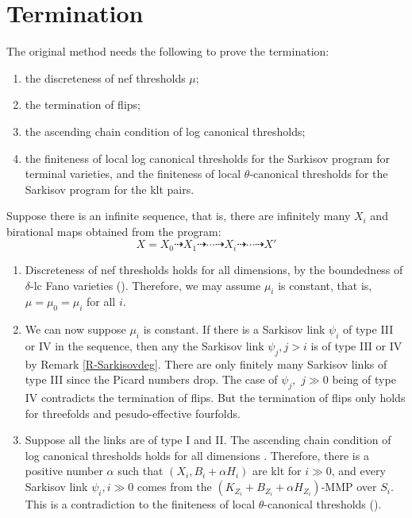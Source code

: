 \section{Termination}\label{termination1}
The original method  needs the following to prove the termination:
\begin{enumerate}
  \item the discreteness of nef thresholds $\mu$;
  \item the termination of flips;
  \item the ascending chain condition of log canonical thresholds;
  \item the finiteness of local log canonical thresholds for the Sarkisov program for terminal varieties, and the finiteness of local $\theta$-canonical thresholds for the Sarkisov program for the klt pairs.
\end{enumerate}
Suppose there is an infinite sequence, that is,  there are infinitely many $ X_i $ and birational maps obtained from the program:
\[ X=X_0\dashrightarrow X_1\dashrightarrow \cdots\dashrightarrow X_i \dashrightarrow\cdots\dashrightarrow X'\]
\begin{enumerate}
  \item Discreteness of nef thresholds holds for all dimensions, by the boundedness of $\delta$-lc Fano varieties (\cite[Theorem 1.1]{birkarSingularitiesLinearSystems2020}). Therefore, we may assume $\mu_{i}$ is constant, that is, $\mu=\mu_{0}=\mu_{i}$ for all $i$.
  \item We can now suppose $\mu_i$ is constant. If there is a Sarkisov link $\psi_i$ of type III or IV in the sequence, then any the Sarkisov link $\psi_j, j>i$ is of type III or IV by Remark \ref{R-Sarkisovdeg}. There are only finitely many Sarkisov links of type III since the Picard numbers drop. The case of $\psi_j,$ $j\gg 0$ being of type IV contradicts the termination of flips. But the termination of flips only holds for threefolds and pesudo-effective fourfolds.
  \item Suppose all the links are of type I and II. The ascending chain condition of log canonical thresholds holds for all dimensions \cite{HMX14}. Therefore, there is a positive number $\alpha$ such that $(X_i,B_i+\alpha H_i)$ are klt for $i\gg 0$, and every Sarkisov link $\psi_i,i\gg 0$ comes from the $(K_{Z_i}+B_{Z_i}+\alpha H_{Z_i})$-MMP over $S_i$. This is a contradiction to  the finiteness of local $\theta$-canonical thresholds (\cite[Claim 2.2]{brunoLogSarkisovProgram1995}).
\end{enumerate}

